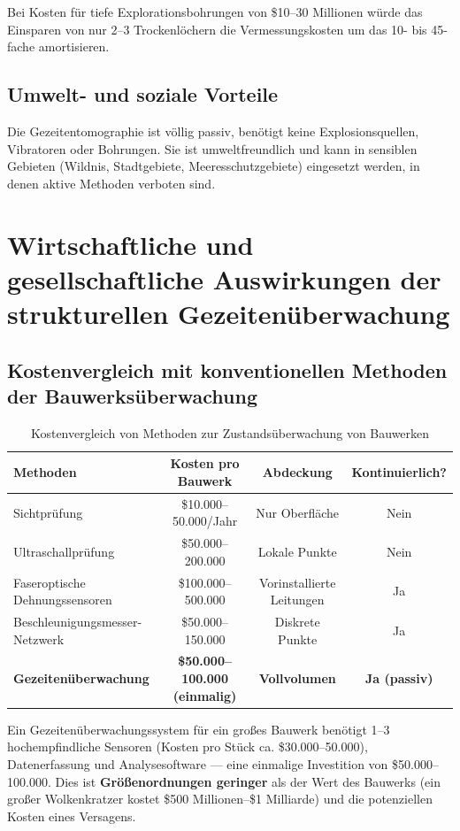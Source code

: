 \documentclass[12pt,a4paper]{article}
\theoremstyle{remark}
\begin{document}
	Bei Kosten für tiefe Explorationsbohrungen von \$10–30 Millionen würde das Einsparen von nur 2–3 Trockenlöchern die Vermessungskosten um das 10- bis 45-fache amortisieren.
	
	\subsection{Umwelt- und soziale Vorteile}
	
	Die Gezeitentomographie ist völlig passiv, benötigt keine Explosionsquellen, Vibratoren oder Bohrungen. Sie ist umweltfreundlich und kann in sensiblen Gebieten (Wildnis, Stadtgebiete, Meeresschutzgebiete) eingesetzt werden, in denen aktive Methoden verboten sind.
	
	\section{Wirtschaftliche und gesellschaftliche Auswirkungen der strukturellen Gezeitenüberwachung}
	\label{sec:structural-economics}
	
	\subsection{Kostenvergleich mit konventionellen Methoden der Bauwerksüberwachung}
	
	\begin{table}[htbp]
		\centering
		\caption{Kostenvergleich von Methoden zur Zustandsüberwachung von Bauwerken}
		\label{tab:structural-costs}
		\small
		\begin{tabular}{lccc}
			\toprule
			\textbf{Methoden} & \textbf{Kosten pro Bauwerk} & \textbf{Abdeckung} & \textbf{Kontinuierlich?} \\
			\midrule
			Sichtprüfung & \$10.000–50.000/Jahr & Nur Oberfläche & Nein \\
			Ultraschallprüfung & \$50.000–200.000 & Lokale Punkte & Nein \\
			Faseroptische Dehnungssensoren & \$100.000–500.000 & Vorinstallierte Leitungen & Ja \\
			Beschleunigungsmesser-Netzwerk & \$50.000–150.000 & Diskrete Punkte & Ja \\
			\textbf{Gezeitenüberwachung} & \textbf{\$50.000–100.000 (einmalig)} & \textbf{Vollvolumen} & \textbf{Ja (passiv)} \\
			\bottomrule
		\end{tabular}
	\end{table}
	
	Ein Gezeitenüberwachungssystem für ein großes Bauwerk benötigt 1–3 hochempfindliche Sensoren (Kosten pro Stück ca. \$30.000–50.000), Datenerfassung und Analysesoftware — eine einmalige Investition von \$50.000–100.000. Dies ist \textbf{Größenordnungen geringer} als der Wert des Bauwerks (ein großer Wolkenkratzer kostet \$500 Millionen–\$1 Milliarde) und die potenziellen Kosten eines Versagens.
	
\end{document}
